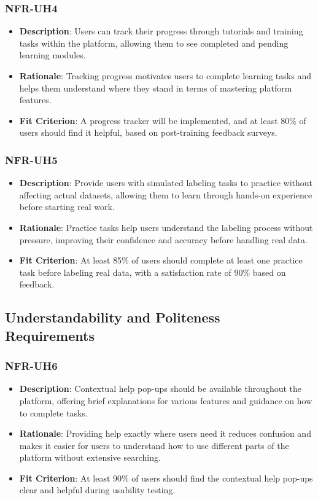 \documentclass[12pt]{article}
\begin{document}
\subsubsection*{NFR-UH4} 
\label{sec:UH4}
        \begin{itemize} 
            \item \textbf{Description}: Users can track their progress through tutorials and training tasks within the platform, allowing them to see completed and pending learning modules.  
            \item \textbf{Rationale}: Tracking progress motivates users to complete learning tasks and helps them understand where they stand in terms of mastering platform features.  
            \item \textbf{Fit Criterion}: A progress tracker will be implemented, and at least 80\% of users should find it helpful, based on post-training feedback surveys.
        \end{itemize}
        \subsubsection*{NFR-UH5} 
        \label{sec:UH5}
        \begin{itemize} 
            \item \textbf{Description}: Provide users with simulated labeling tasks to practice without affecting actual datasets, allowing them to learn through hands-on experience before starting real work.  
            \item \textbf{Rationale}: Practice tasks help users understand the labeling process without pressure, improving their confidence and accuracy before handling real data.  
            \item \textbf{Fit Criterion}: At least 85\% of users should complete at least one practice task before labeling real data, with a satisfaction rate of 90\% based on feedback.
        \end{itemize}


\subsection{Understandability and Politeness Requirements}


\subsubsection*{NFR-UH6} 
\label{sec:UH6}
        \begin{itemize} 
            \item \textbf{Description}: Contextual help pop-ups should be available throughout the platform, offering brief explanations for various features and guidance on how to complete tasks.  
            \item \textbf{Rationale}: Providing help exactly where users need it reduces confusion and makes it easier for users to understand how to use different parts of the platform without extensive searching.  
            \item \textbf{Fit Criterion}: At least 90\% of users should find the contextual help pop-ups clear and helpful during usability testing.
        \end{itemize}
\end{document}
